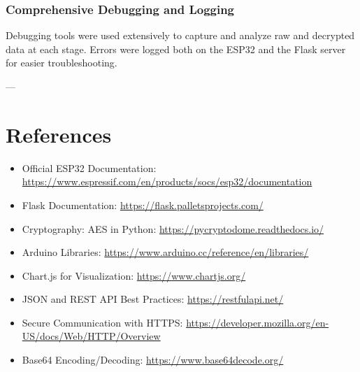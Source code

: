 \documentclass[a4paper,12pt]{report}
\begin{document}
\subsection{Comprehensive Debugging and Logging}
Debugging tools were used extensively to capture and analyze raw and decrypted data at each stage. Errors were logged both on the ESP32 and the Flask server for easier troubleshooting.

---

\chapter{References}

\begin{itemize}
    \item Official ESP32 Documentation: \url{https://www.espressif.com/en/products/socs/esp32/documentation}
    \item Flask Documentation: \url{https://flask.palletsprojects.com/}
    \item Cryptography: AES in Python: \url{https://pycryptodome.readthedocs.io/}
    \item Arduino Libraries: \url{https://www.arduino.cc/reference/en/libraries/}
    \item Chart.js for Visualization: \url{https://www.chartjs.org/}
    \item JSON and REST API Best Practices: \url{https://restfulapi.net/}
    \item Secure Communication with HTTPS: \url{https://developer.mozilla.org/en-US/docs/Web/HTTP/Overview}
    \item Base64 Encoding/Decoding: \url{https://www.base64decode.org/}
\end{itemize}
\end{document}
